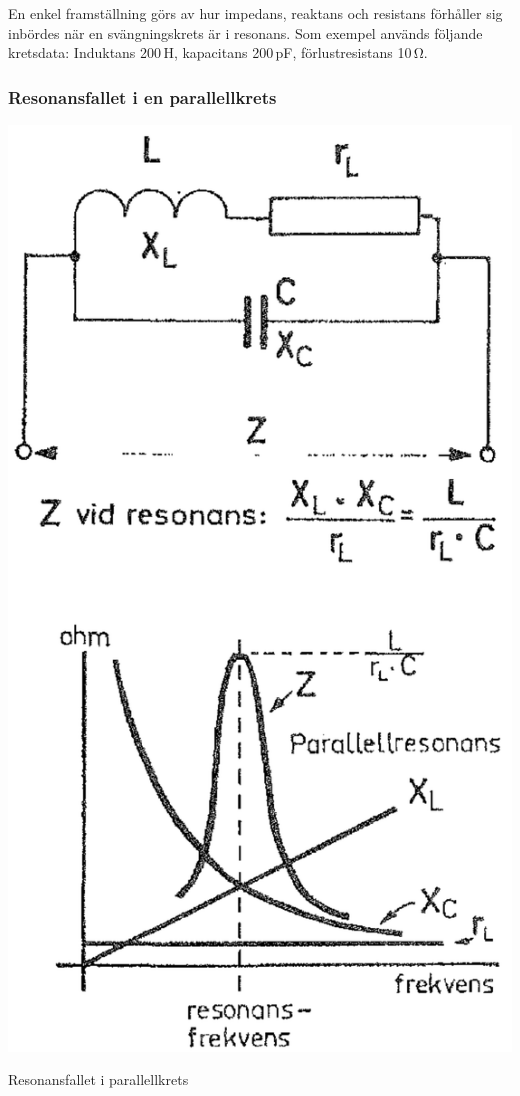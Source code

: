 En enkel framställning görs av hur impedans, reaktans och resistans förhåller
sig inbördes när en svängningskrets är i resonans.
Som exempel används följande kretsdata: Induktans 200\,\textmu H,
kapacitans 200\,pF, förlustresistans 10\,\unit{\ohm}.

\subsubsection{Resonansfallet i en parallellkrets}
\label{parallellresonans}

\begin{marginfigure}
  \includegraphics[width=\textwidth]{images/cropped_pdfs/bild_2_3-18.pdf}
  \caption{Resonansfallet i parallellkrets}
  \label{fig:BildII3-18}
\end{marginfigure}

